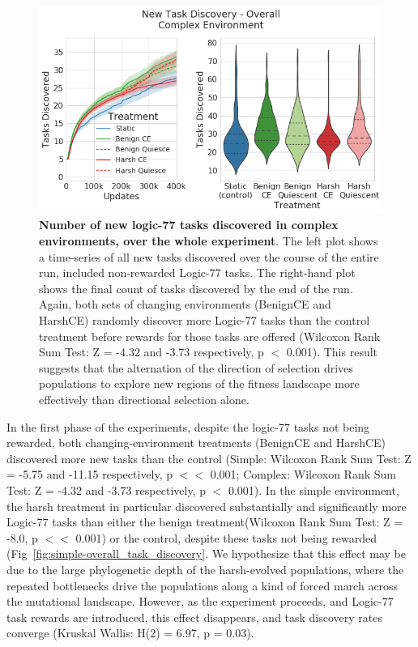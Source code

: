 \documentclass[PhD]{msu-thesis}
\begin{document}
	\begin{figure}[!h]
	\includegraphics[width=0.95\columnwidth]{figures/LTE/lte-complex-overall_task_discovery.png}
	\caption{\textbf{Number of new logic-77 tasks discovered in complex environments, over the whole experiment}. The left plot shows a time-series of all new tasks discovered over the course of the entire run, included non-rewarded Logic-77 tasks. The right-hand plot shows the final count of tasks discovered by the end of the run. Again, both sets of changing environments (BenignCE and HarshCE) randomly discover more Logic-77 tasks than the control treatment before rewards for those tasks are offered (Wilcoxon Rank Sum Test: Z = -4.32 and -3.73 respectively, p $<$ 0.001). This result suggests that the alternation of the direction of selection drives populations to explore new regions of the fitness landscape more effectively than directional selection alone.%
	}
	\label{fig:complex-overall_task_discovery}
	\end{figure}
In the first phase of the experiments, despite the logic-77 tasks not being rewarded, both changing-environment treatments (BenignCE and HarshCE) discovered more new tasks than the control (Simple: Wilcoxon Rank Sum Test: Z = -5.75 and -11.15 respectively, p $<<$ 0.001; Complex: Wilcoxon Rank Sum Test: Z = -4.32 and -3.73 respectively, p $<$ 0.001). In the simple environment, the harsh treatment in particular discovered substantially and significantly more Logic-77 tasks than either the benign treatment(Wilcoxon Rank Sum Test: Z = -8.0, p $<<$ 0.001) or the control, despite these tasks not being rewarded (Fig~\ref{fig:simple-overall_task_discovery}. We hypothesize that this effect may be due to the large phylogenetic depth of the harsh-evolved populations, where the repeated bottlenecks drive the populations along a kind of forced march across the mutational landscape. However, as the experiment proceeds, and Logic-77 task rewards are introduced, this effect disappears, and task discovery rates converge (Kruskal Wallis: H(2) = 6.97, p = 0.03).
\end{document}
